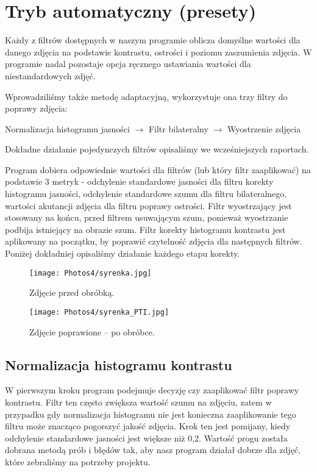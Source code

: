 \documentclass[]{mwart}
\begin{document}
\section{Tryb automatyczny (presety)}
Każdy z filtrów dostępnych w naszym programie oblicza domyślne
wartości dla danego zdjęcia na podstawie kontrastu, ostrości i
poziomu zaszumienia zdjęcia.
W programie nadal pozostaje opcja ręcznego ustawiania wartości
dla niestandardowych zdjęć.

Wprowadziliśmy także metodę adaptacyjną, wykorzystuje ona trzy
filtry do poprawy zdjęcia:
\begin{center}
    Normalizacja histogramu jasności $\to$ Filtr bilateralny $\to$ Wyostrzenie zdjęcia
\end{center}

Dokładne działanie pojedynczych filtrów opisaliśmy we wcześniejszych raportach.

Program dobiera odpowiednie wartości dla filtrów (lub który filtr zaaplikować)
na podstawie 3 metryk - odchylenie standardowe jasności dla filtru
korekty histogramu jasności, odchylenie standardowe szumu dla
filtru bilateralnego, wartości akutancji zdjęcia dla filtru
poprawy ostrości. Filtr wyostrzający jest stosowany na końcu,
przed filtrem usuwającym szum,
ponieważ wyostrzanie podbija istniejący na obrazie szum.
Filtr korekty histogramu kontrastu jest aplikowany na początku,
by poprawić czytelność zdjęcia dla następnych filtrów.
Poniżej dokładniej opisaliśmy działanie każdego etapu korekty.

\begin{figure}[H]
    \centering
    \texttt{[image: Photos4/syrenka.jpg]}
    \caption{Zdjęcie przed obróbką.}
\end{figure}
\begin{figure}[H]
    \centering
    \texttt{[image: Photos4/syrenka\_PTI.jpg]}
    \caption{Zdjęcie poprawione -- po obróbce.}
\end{figure}

\subsection{Normalizacja histogramu kontrastu}
W pierwszym kroku program podejmuje decyzję czy zaaplikować filtr
poprawy kontrastu. Filtr ten często zwiększa wartość szumu na zdjęciu,
zatem w przypadku gdy normalizacja histogramu nie jest konieczna
zaaplikowanie tego filtru może znacząco pogorszyć jakość zdjęcia.
Krok ten jest pomijany, kiedy odchylenie standardowe jasności
jest większe niż 0,2. Wartość progu została dobrana metodą prób
i błędów tak, aby nasz program działał dobrze dla zdjęć, które
zebraliśmy na potrzeby projektu.
\end{document}

